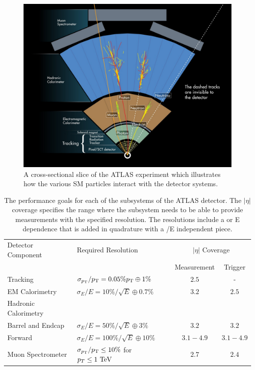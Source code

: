\begin{figure}[hbtp]
\includegraphics[width=\fullfig]{figures/particle_interactions.png}
\caption{A cross-sectional slice of the ATLAS experiment which illustrates how the various \acs*{SM} particles interact with the detector systems.}
\label{fig:particle_interactions}
\end{figure}

\begin{table}
\centering
\begin{tabular}{llcc}
  \hline
  Detector Component & Required Resolution & \multicolumn{2}{c}{$|\eta|$ Coverage} \\
                     &                     & Measurement & Trigger \\
  \hline
  Tracking & $\sigma_{p_{\mathrm{T}}}/p_{\mathrm{T}} = 0.05\% p_{\mathrm{T}} \oplus 1\%$ & $2.5$ & - \\
  EM Calorimetry & $\sigma_{E}/E = 10\%/\sqrt{E} \oplus 0.7\%$ & $3.2$ & $2.5$ \\
  Hadronic Calorimetry & & \\
  \quad Barrel and Endcap & $\sigma_{E}/E = 50\%/\sqrt{E} \oplus 3\%$ & $3.2$ & $3.2$ \\
  \quad Forward & $\sigma_{E}/E = 100\%/\sqrt{E} \oplus 10\%$ & $3.1 - 4.9$ & $3.1 - 4.9$ \\
  Muon Spectrometer & $\sigma_{p_{\mathrm{T}}}/p_{\mathrm{T}} \leq 10\%$ for $p_T \leq 1\ \mathrm{Te\kern -0.05em V}$ & $2.7$ & $2.4$ \\
  \hline
\end{tabular}
\caption{The performance goals for each of the subsystems of the ATLAS detector. The $|\eta|$ coverage specifies the range where the subsystem needs to be able to provide measurements with the specified resolution. The resolutions include a \pt or E dependence that is added in quadrature with a \pt/E independent piece.}
\label{tab:performance_goals}
\end{table}

